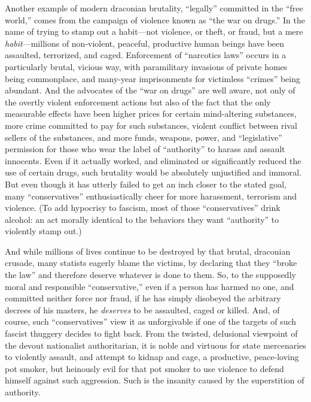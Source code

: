 \documentclass{book}
\begin{document}
Another example of modern draconian brutality, \enquote{legally} committed in the \enquote{free world,} comes from the campaign of violence known as \enquote{the war on drugs.} In the name of trying to stamp out a habit---not violence, or theft, or fraud, but a mere \emph{habit}---millions of non-violent, peaceful, productive human beings have been assaulted, terrorized, and caged. Enforcement of \enquote{narcotics laws} occurs in a particularly brutal, vicious way, with paramilitary invasions of private homes being commonplace, and many-year imprisonments for victimless \enquote{crimes} being abundant. And the advocates of the \enquote{war on drugs} are well aware, not only of the overtly violent enforcement actions but also of the fact that the only measurable effects have been higher prices for certain mind-altering substances, more crime committed to pay for such substances, violent conflict between rival sellers of the substances, and more funds, weapons, power, and \enquote{legislative} permission for those who wear the label of \enquote{authority} to harass and assault innocents. Even if it actually worked, and eliminated or significantly reduced the use of certain drugs, such brutality would be absolutely unjustified and immoral. But even though it has utterly failed to get an inch closer to the stated goal, many \enquote{conservatives} enthusiastically cheer for more harassment, terrorism and violence. (To add hypocrisy to fascism, most of those \enquote{conservatives} drink alcohol: an act morally identical to the behaviors they want \enquote{authority} to violently stamp out.)

And while millions of lives continue to be destroyed by that brutal, draconian crusade, many statists eagerly blame the victims, by declaring that they \enquote{broke the law} and therefore deserve whatever is done to them. So, to the supposedly moral and responsible \enquote{conservative,} even if a person has harmed no one, and committed neither force nor fraud, if he has simply disobeyed the arbitrary decrees of his masters, he \emph{deserves} to be assaulted, caged or killed. And, of course, such \enquote{conservatives} view it as unforgivable if one of the targets of such fascist thuggery decides to fight back. From the twisted, delusional viewpoint of the devout nationalist authoritarian, it is noble and virtuous for state mercenaries to violently assault, and attempt to kidnap and cage, a productive, peace-loving pot smoker, but heinously evil for that pot smoker to use violence to defend himself against such aggression. Such is the insanity caused by the superstition of authority.
\end{document}
